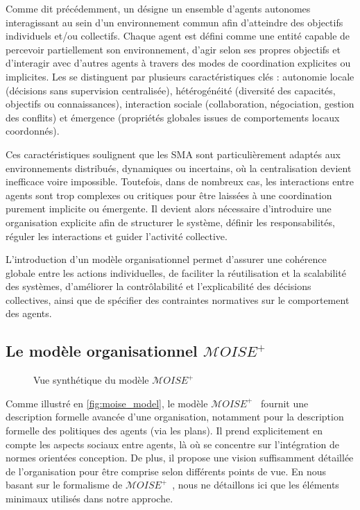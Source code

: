 Comme dit précédemment, un  désigne un ensemble d'agents autonomes interagissant au sein d'un environnement commun afin d'atteindre des objectifs individuels et/ou collectifs. Chaque agent est défini comme une entité capable de percevoir partiellement son environnement, d'agir selon ses propres objectifs et d'interagir avec d'autres agents à travers des modes de coordination explicites ou implicites. Les  se distinguent par plusieurs caractéristiques clés : autonomie locale (décisions sans supervision centralisée), hétérogénéité (diversité des capacités, objectifs ou connaissances), interaction sociale (collaboration, négociation, gestion des conflits) et émergence (propriétés globales issues de comportements locaux coordonnés).

Ces caractéristiques soulignent que les SMA sont particulièrement adaptés aux environnements distribués, dynamiques ou incertains, où la centralisation devient inefficace voire impossible. Toutefois, dans de nombreux cas, les interactions entre agents sont trop complexes ou critiques pour être laissées à une coordination purement implicite ou émergente. Il devient alors nécessaire d’introduire une organisation explicite afin de structurer le système, définir les responsabilités, réguler les interactions et guider l’activité collective.

L’introduction d’un modèle organisationnel permet d’assurer une cohérence globale entre les actions individuelles, de faciliter la réutilisation et la scalabilité des systèmes, d’améliorer la contrôlabilité et l’explicabilité des décisions collectives, ainsi que de spécifier des contraintes normatives sur le comportement des agents.

\subsection{Le modèle organisationnel $\mathcal{M}OISE^+$}

\begin{figure}[h!]
  \centering
  
  \caption{Vue synthétique du modèle $\mathcal{M}OISE^+$}
  \label{fig:moise_model}
\end{figure}

Comme illustré en \autoref{fig:moise_model}, le modèle $\mathcal{M}OISE^+$~\citep{Hubner2002} fournit une description formelle avancée d'une organisation, notamment pour la description formelle des politiques des agents (via les plans). Il prend explicitement en compte les aspects sociaux entre agents, là où  se concentre sur l'intégration de normes orientées conception. De plus, il propose une vision suffisamment détaillée de l'organisation pour être comprise selon différents points de vue.
En nous basant sur le formalisme de $\mathcal{M}OISE^+$~\citep{hubner2007moise}, nous ne détaillons ici que les éléments minimaux utilisés dans notre approche.

